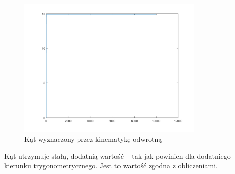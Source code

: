 \documentclass[a4paper, 12pt]{report}
\begin{document}
				\begin{figure}[H]
					\centering
					\includegraphics[width = 0.8\textwidth]{./AP/img/rev/left_circle_in_3.png}
					\caption{Kąt wyznaczony przez kinematykę odwrotną}
				\end{figure}
				\noindent Kąt utrzymuje stałą, dodatnią wartość -- tak jak powinien dla dodatniego kierunku trygonometrycznego. Jest to wartość zgodna z obliczeniami.
			\newpage
\end{document}
